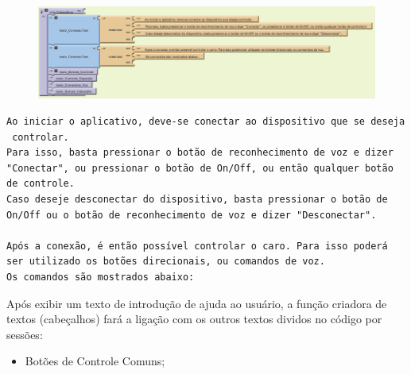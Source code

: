 \documentclass[portugues, brazil, a4paper,12pt]{article}
\begin{document}
\begin{figure}[H]
	\centering
	\includegraphics[scale=.7]{img/ajuda/cabecalho.png}
	
\end{figure}

\begin{verbatim}
Ao iniciar o aplicativo, deve-se conectar ao dispositivo que se deseja
 controlar.
Para isso, basta pressionar o botão de reconhecimento de voz e dizer 
"Conectar", ou pressionar o botão de On/Off, ou então qualquer botão 
de controle.
Caso deseje desconectar do dispositivo, basta pressionar o botão de 
On/Off ou o botão de reconhecimento de voz e dizer "Desconectar".

Após a conexão, é então possível controlar o caro. Para isso poderá 
ser utilizado os botões direcionais, ou comandos de voz.
Os comandos são mostrados abaixo:

\end{verbatim}

Após exibir um texto de introdução de ajuda ao usuário, a função criadora de textos (cabeçalhos) fará a ligação com os outros textos dividos no código por sessões:

\begin{itemize}
\item Botões de Controle Comuns;
\end{itemize}
\end{document}

